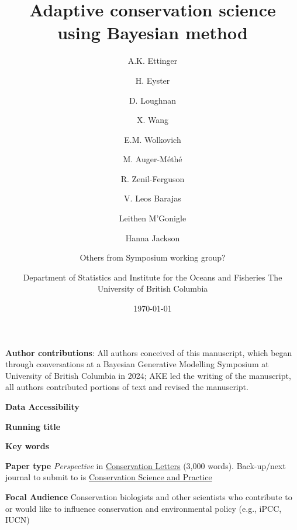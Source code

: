 \documentclass{article}
\begin{document}



\title{Adaptive conservation science using Bayesian method} 
\author[1,a]{A.K. Ettinger}
\author[2]{H. Eyster}
\author[3]{D. Loughnan}
\author[3]{X. Wang}
\author[3]{E.M. Wolkovich}
\author[4]{M. Auger-M\'eth\'e}
\author[5]{R. Zenil-Ferguson}
\author[6]{V. Leos Barajas}
\author[7]{Leithen M'Gonigle}
\author[7]{Hanna Jackson}
\author[8]{Others from Symposium working group?}


\author[4]{Department of Statistics and Institute for the Oceans and Fisheries The University of British Columbia}



\date{\today}
\maketitle 
\textbf{Author contributions}: All authors conceived of this manuscript, which began through conversations at a Bayesian Generative Modelling Symposium at University of British Columbia in 2024; AKE led the writing of the manuscript, all authors contributed portions of text and revised the manuscript.

\textbf{Data Accessibility} 

\textbf{Running title} 

\textbf{Key words} 


\textbf{Paper type} \textit{Perspective} in \href{https://conbio.onlinelibrary.wiley.com/hub/journal/1755263x/homepage/forauthors.html#ATypes}{Conservation Letters} (3,000 words). Back-up/next journal to submit to is \href{https://conbio.onlinelibrary.wiley.com/hub/journal/25784854/homepage/author-guidelines}{Conservation Science and Practice} 

\textbf{Focal Audience} Conservation biologists and other scientists who contribute to or would like to influence conservation and environmental policy (e.g., iPCC, IUCN)



\end{document}
